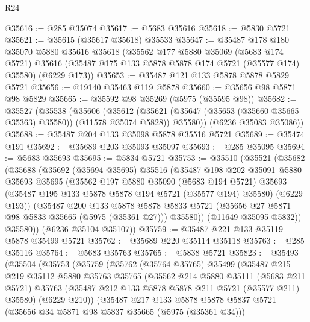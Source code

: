 \begin{lexlean}{R24}
\begin{coremodule}
@35616 := @285 @35074
@35617 := @5683 @35616
@35618 := @5830 @5721
@35621 := @35615 (@35617 @35618) @35533
@35647 := @35487
    @178
    @180
    @35070
    @5880
    @35616
    @35618
    (@35562
      @177
      @5880
      @35069
      (@5683 @174 @5721)
      @35616
      (@35487 @175 @133 @5878 @5878 @174 @5721 (@35577 @174) @35580)
      (@6229 @173))
@35653 := @35487 @121 @133 @5878 @5878 @5829 @5721
@35656 := @19140 @35463 @119 @5878
@35660 := @35656 @98 @5871 @98 @5829
@35665 := @35592 @98 @35269 (@5975 (@35595 @98))
@35682 := @35527
    (@35538
      (@35606
        (@35612
          (@35621 (@35647 (@35653 (@35660 @35665 @35363) @35580)) (@11578 @35074 @5828))
          @35580))
      (@6236 @35083 @35086))
@35688 := @35487 @204 @133 @35098 @5878 @35516 @5721
@35689 := @35474 @191
@35692 := @35689 @203 @35093 @35097
@35693 := @285 @35095
@35694 := @5683 @35693
@35695 := @5834 @5721
@35753 := @35510
    (@35521
      (@35682
        (@35688
          (@35692
            (@35694 @35695)
            @35516
            (@35487
              @198
              @202
              @35091
              @5880
              @35693
              @35695
              (@35562
                @197
                @5880
                @35090
                (@5683 @194 @5721)
                @35693
                (@35487 @195 @133 @5878 @5878 @194 @5721 (@35577 @194) @35580)
                (@6229 @193))
              (@35487
                @200
                @133
                @5878
                @5878
                @5833
                @5721
                (@35656 @27 @5871 @98 @5833 @35665 (@5975 (@35361 @27)))
                @35580))
            (@11649 @35095 @5832))
          @35580))
      (@6236 @35104 @35107))
@35759 := @35487 @221 @133 @35119 @5878 @35499 @5721
@35762 := @35689 @220 @35114 @35118
@35763 := @285 @35116
@35764 := @5683 @35763
@35765 := @5838 @5721
@35823 := @35493
    (@35504
      (@35753
        (@35759
          (@35762
            (@35764 @35765)
            @35499
            (@35487
              @215
              @219
              @35112
              @5880
              @35763
              @35765
              (@35562
                @214
                @5880
                @35111
                (@5683 @211 @5721)
                @35763
                (@35487 @212 @133 @5878 @5878 @211 @5721 (@35577 @211) @35580)
                (@6229 @210))
              (@35487
                @217
                @133
                @5878
                @5878
                @5837
                @5721
                (@35656 @34 @5871 @98 @5837 @35665 (@5975 (@35361 @34)))

\end{coremodule}
\end{lexlean}
